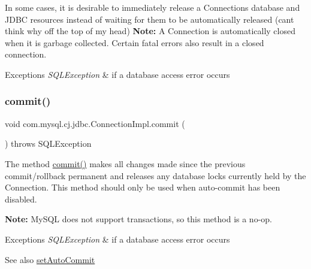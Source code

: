 In some cases, it is desirable to immediately release a Connection\textquotesingle{}s database and J\+D\+BC resources instead of waiting for them to be automatically released (cant think why off the top of my head) {\bfseries Note\+:} A Connection is automatically closed when it is garbage collected. Certain fatal errors also result in a closed connection.


\begin{DoxyExceptions}{Exceptions}
{\em S\+Q\+L\+Exception} & if a database access error occurs \\
\hline
\end{DoxyExceptions}
\mbox{\label{classcom_1_1mysql_1_1cj_1_1jdbc_1_1_connection_impl_ac6218bc1a284e67ff9557bdefc52c388}} 
\subsubsection{\texorpdfstring{commit()}{commit()}}
{\footnotesize\ttfamily void com.\+mysql.\+cj.\+jdbc.\+Connection\+Impl.\+commit (\begin{DoxyParamCaption}{ }\end{DoxyParamCaption}) throws S\+Q\+L\+Exception}

The method \mbox{\hyperlink{classcom_1_1mysql_1_1cj_1_1jdbc_1_1_connection_impl_ac6218bc1a284e67ff9557bdefc52c388}{commit()}} makes all changes made since the previous commit/rollback permanent and releases any database locks currently held by the Connection. This method should only be used when auto-\/commit has been disabled. 

{\bfseries Note\+:} My\+S\+QL does not support transactions, so this method is a no-\/op. 


\begin{DoxyExceptions}{Exceptions}
{\em S\+Q\+L\+Exception} & if a database access error occurs \\
\hline
\end{DoxyExceptions}
\begin{DoxySeeAlso}{See also}
\mbox{\hyperlink{classcom_1_1mysql_1_1cj_1_1jdbc_1_1_connection_impl_a53c90790a0e3d5c1ebae0278a15453be}{set\+Auto\+Commit}} 
\end{DoxySeeAlso}
\mbox{\label{classcom_1_1mysql_1_1cj_1_1jdbc_1_1_connection_impl_a063addf80134be647765cd125d270968}} 
